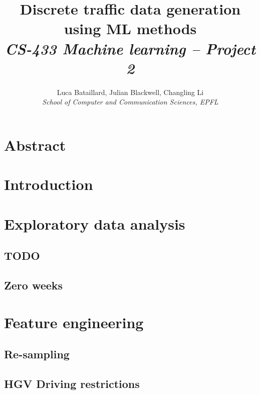 \documentclass[10pt,conference,compsocconf]{IEEEtran}
\begin{document}
\title{%
    Discrete traffic data generation using ML methods \\
    \large \textit{CS-433 Machine learning -- Project 2}
}

\author{
  Luca Bataillard, Julian Blackwell, Changling Li\\
  \textit{School of Computer and Communication Sciences, EPFL}
}

\maketitle

\section{Abstract}

\cite{tensorflow2015-whitepaper}



\section{Introduction}



\section{Exploratory data analysis}

\subsection{TODO}

\subsection{Zero weeks}



\section{Feature engineering}

\subsection{Re-sampling}

\subsection{HGV Driving restrictions}
\end{document}
